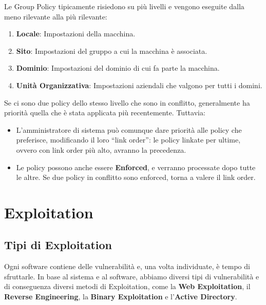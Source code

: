 \documentclass{article}
\begin{document}
Le Group Policy tipicamente risiedono su più livelli e vengono eseguite dalla meno rilevante alla più rilevante:
\begin{enumerate}
    \item \textbf{Locale}: Impostazioni della macchina.
    \item \textbf{Sito}: Impostazioni del gruppo a cui la macchina è associata.
    \item \textbf{Dominio}: Impostazioni del dominio di cui fa parte la macchina.
    \item \textbf{Unità Organizzativa}: Impostazioni aziendali che valgono per tutti i domini.
\end{enumerate}

Se ci sono due policy dello stesso livello che sono in conflitto, generalmente ha priorità quella che è stata applicata più recentemente. Tuttavia:
\begin{itemize}
    \item L’amministratore di sistema può comunque dare priorità alle policy che preferisce, modificando il loro “link order”: le policy linkate per ultime, ovvero con link order più alto, avranno la precedenza.

    \item Le policy possono anche essere \textbf{Enforced}, e verranno processate dopo tutte le altre. Se due policy in conflitto sono enforced, torna a valere il link order.
\end{itemize}


\newpage
\section{Exploitation}
\subsection{Tipi di Exploitation}
Ogni software contiene delle vulnerabilità e, una volta individuate, è tempo di sfruttarle. In base al sistema e al software, abbiamo diversi tipi di vulnerabilità e di conseguenza diversi metodi di Exploitation, come la \textbf{Web Exploitation}, il \textbf{Reverse Engineering}, la \textbf{Binary Exploitation} e l'\textbf{Active Directory}.
\end{document}
